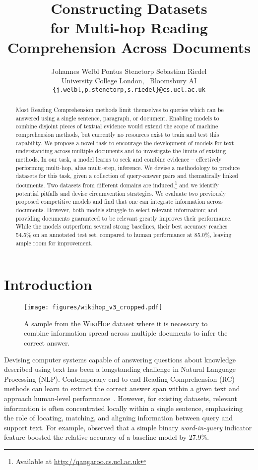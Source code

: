 \documentclass[11pt,letterpaper]{article}
\title{
    Constructing Datasets \\
    for Multi-hop Reading Comprehension Across Documents
}
\author{
    {Johannes Welbl \hspace{5em} Pontus Stenetorp \hspace{5em} Sebastian Riedel \vspace{0.5em}}\\
    {\centering University College London,~ Bloomsbury AI} \\
    {\centering \tt \{j.welbl,p.stenetorp,s.riedel\}@cs.ucl.ac.uk}
}
\date{}
\newcommand{\WikiHop}{\textsc{WikiHop}\xspace}
\begin{document}
\maketitle



\begin{abstract}
    Most Reading Comprehension methods limit themselves to queries which can be answered using a single sentence, paragraph, or document.
Enabling models to combine disjoint pieces of textual evidence would extend the scope of machine comprehension methods, but currently no resources exist to train and test this capability.
We propose a novel task to encourage the development of models for text understanding across multiple documents and to investigate the limits of existing methods.
In our task, a model learns to seek and combine evidence -- effectively performing multi-hop, alias multi-step, inference.
We devise a methodology to produce datasets for this task, given a collection of query-answer pairs and thematically linked documents.
Two datasets from different domains are induced,\footnote{Available at \url{http://qangaroo.cs.ucl.ac.uk}} 
    and we identify potential pitfalls and devise circumvention strategies.
We evaluate two previously proposed competitive models and find that one can integrate information across documents.
However, both models struggle to select relevant information; and providing documents guaranteed to be relevant greatly improves their performance.
While the models outperform several strong baselines, their best accuracy reaches 
54.5\% on an annotated test set, compared to human performance at 
85.0\%, leaving ample room for improvement.
\end{abstract}



\section{Introduction}
\begin{figure}[t]
    \centering
\texttt{[image: figures/wikihop\_v3\_cropped.pdf]}
    \caption{
        A sample from the \WikiHop dataset where it is necessary to combine information spread across multiple documents to infer the correct answer.
}
    \label{fig:mumbai}
\end{figure}
Devising computer systems capable of answering questions about knowledge described using text has been a longstanding challenge in Natural Language Processing (NLP). 
Contemporary end-to-end Reading Comprehension (RC) methods can learn to extract the correct answer span within a given text and approach human-level performance~\cite{Kadlec2016ASR,Seo2016BidAF}.
However, for existing datasets, relevant information is often concentrated locally within a single sentence, emphasizing the role of locating, matching, and aligning information between query and support text.
For example,  observed that a simple binary \emph{word-in-query} indicator feature boosted the relative accuracy of a baseline model by 27.9\%.
\end{document}
